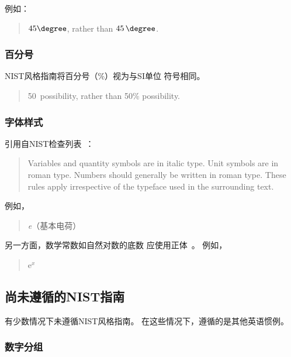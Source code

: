 例如：

\begin{quote}
  $45\degree$, rather than $45\,\degree$.
\end{quote}

\subsubsection{百分号}
\label{sec:app:styleguide:Percent Symbol}

NIST风格指南将百分号（\%）视为与SI单位
符号相同。

\begin{quote}
  50\pct\ possibility, rather than 50\% possibility.
\end{quote}

\subsubsection{字体样式}
\label{sec:app:styleguide:Font Style}

引用自NIST检查列表~\cite[\#6]{NIST:UnitCheckList}：

\begin{quote}
  Variables and quantity symbols are in italic type.
  Unit symbols are in roman type.
  Numbers should generally be written in roman type.
  These rules apply irrespective of the typeface used in the surrounding
  text.
\end{quote}

例如，
\begin{quote}
  {\textit e}（基本电荷）
\end{quote}

另一方面，数学常数如自然对数的底数
应使用正体~\cite{NIST:TypeFaces}。
例如，

\begin{quote}
  $\mathrm{e}^x$
\end{quote}


\subsection{尚未遵循的NIST指南}
\label{sec:app:styleguide:NIST Guides Yet To Be Followed}

有少数情况下未遵循NIST风格指南。
在这些情况下，遵循的是其他英语惯例。

\subsubsection{数字分组}
\label{sec:app:styleguide:Digit Grouping}

